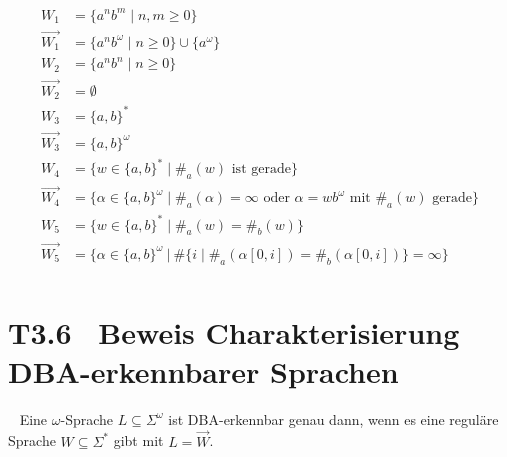 \documentclass[fontsize=11pt, twoside=false, numbers=autoenddot]{scrbook}
\begin{document}
\begin{align*}
  W_1       & = \{a^nb^m \mid n,m \geq 0\}                                           \\
  \Vec{W_1} & = \{a^nb^\omega \mid n \geq 0\} \cup \{a^\omega\}                      \\[8pt]
  W_2       & = \{a^nb^n \mid n \geq 0\}                                             \\
  \Vec{W_2} & = \emptyset                                                            \\[8pt]
  W_3       & = \{a,b\}^*                                                            \\
  \Vec{W_3} & = \{a,b\}^\omega                                                       \\[8pt]
  W_4       & = \{w \in \{a,b\}^* \mid \#_a(w) \text{~ist gerade}\}                  \\
  \Vec{W_4} & = \{\alpha \in \{a,b\}^\omega \mid \#_a(\alpha) = \infty \text{~oder~}
                 \alpha = wb^\omega \text{~mit~} \#_a(w) \text{~gerade}\}            \\[8pt]
  W_5       & = \{w \in \{a,b\}^* \mid \#_a(w) = \#_b(w)\}                           \\
  \Vec{W_5} & = \Big\{\alpha \in \{a,b\}^\omega ~\Big|~ \#\{i \mid \#_a(\alpha[0,i]) = \#_b(\alpha[0,i])\} = \infty\Big\}            \\[8pt]
\end{align*}

\section*{T3.6~ Beweis Charakterisierung DBA-erkennbarer Sprachen}

~
Eine $\omega$-Sprache $L \subseteq \Sigma^\omega$
ist DBA-erkennbar genau dann,
wenn es eine reguläre Sprache $W \subseteq \Sigma^*$ gibt
mit $L = \Vec W$.
\end{document}
